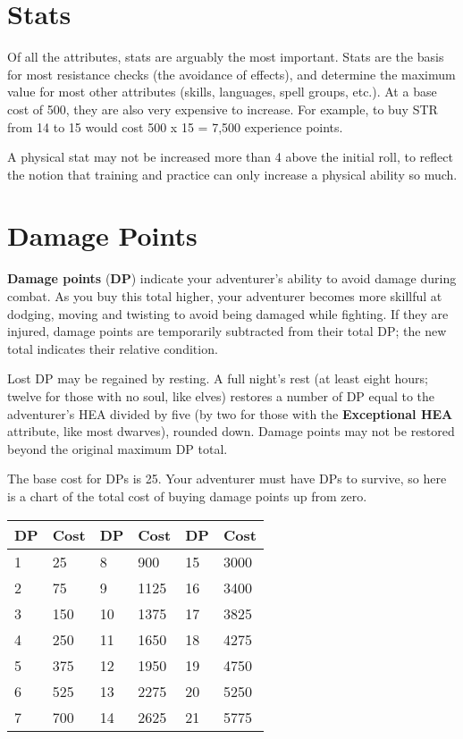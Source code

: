 \begin{multicols*}{2}
\section{Stats}
Of all the attributes, stats are arguably the most important. Stats are the basis for most resistance checks (the avoidance of effects), and determine the maximum value for most other attributes (skills, languages, spell groups, etc.). At a base cost of 500, they are also very expensive to increase. For example, to buy STR from 14 to 15 would cost 500 x 15 = 7,500 experience points.

A physical stat may not be increased more than 4 above the initial roll, to reflect the notion that training and practice can only increase a physical ability so much.
\section{Damage Points}
\textbf{Damage points} (\textbf{DP}) indicate your adventurer's ability to avoid damage during combat. As you buy this total higher, your adventurer becomes more skillful at dodging, moving and twisting to avoid being damaged while fighting. If they are injured, damage points are temporarily subtracted from their total DP; the new total indicates their relative condition.

Lost DP may be regained by resting. A full night's rest (at least eight hours; twelve for those with no soul, like elves) restores a number of DP equal to the adventurer's HEA divided by five (by two for those with the \textbf{Exceptional HEA} attribute, like most dwarves), rounded down. Damage points may not be restored beyond the original maximum DP total.

The base cost for DPs is 25. Your adventurer must have DPs to survive, so here is a chart of the total cost of buying damage points up from zero.

\begin{normbox}
\begin{tabular}{l l|l l|l l}
DP & Cost & DP & Cost & DP & Cost\\
\midrule
1 & 25 & 8 & 900 & 15 & 3000\\
2 & 75 & 9 & 1125 & 16 & 3400\\
3 & 150 & 10 & 1375 & 17 & 3825\\
4 & 250 & 11 & 1650 & 18 & 4275\\
5 & 375 & 12 & 1950 & 19 & 4750\\
6 & 525 & 13 & 2275 & 20 & 5250\\
7 & 700 & 14 & 2625 & 21 & 5775\\
\end{tabular}
\end{normbox}


\end{multicols*}
